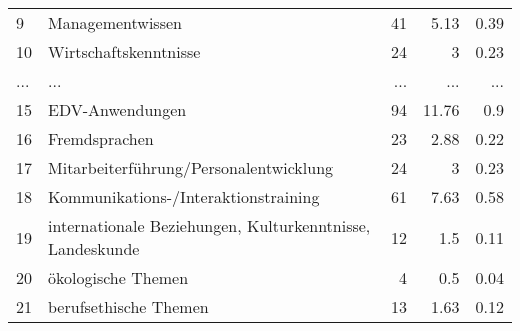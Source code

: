 \begin{longtable}{lXrrr}
        9 & \multicolumn{1}{X}{Managementwissen} & %
          \num{41} &
          \num[round-mode=places,round-precision=2]{5,13} &
          \num[round-mode=places,round-precision=2]{0,39} \\
        10 & \multicolumn{1}{X}{Wirtschaftskenntnisse} & %
          \num{24} &
          \num[round-mode=places,round-precision=2]{3} &
          \num[round-mode=places,round-precision=2]{0,23} \\
       ... & ... & ... & ... & ... \\
        15 & \multicolumn{1}{X}{EDV-Anwendungen} & %
          \num{94} &
          \num[round-mode=places,round-precision=2]{11,76} &
          \num[round-mode=places,round-precision=2]{0,9} \\

        16 & \multicolumn{1}{X}{Fremdsprachen} & %
          \num{23} &
          \num[round-mode=places,round-precision=2]{2,88} &
          \num[round-mode=places,round-precision=2]{0,22} \\

        17 & \multicolumn{1}{X}{Mitarbeiterführung/Personalentwicklung} & %
          \num{24} &
          \num[round-mode=places,round-precision=2]{3} &
          \num[round-mode=places,round-precision=2]{0,23} \\

        18 & \multicolumn{1}{X}{Kommunikations-/Interaktionstraining} & %
          \num{61} &
          \num[round-mode=places,round-precision=2]{7,63} &
          \num[round-mode=places,round-precision=2]{0,58} \\

        19 & \multicolumn{1}{X}{internationale Beziehungen, Kulturkenntnisse, Landeskunde} & %
          \num{12} &
          \num[round-mode=places,round-precision=2]{1,5} &
          \num[round-mode=places,round-precision=2]{0,11} \\

        20 & \multicolumn{1}{X}{ökologische Themen} & %
          \num{4} &
          \num[round-mode=places,round-precision=2]{0,5} &
          \num[round-mode=places,round-precision=2]{0,04} \\

        21 & \multicolumn{1}{X}{berufsethische Themen} & %
          \num{13} &
          \num[round-mode=places,round-precision=2]{1,63} &
          \num[round-mode=places,round-precision=2]{0,12} \\


\end{longtable}
